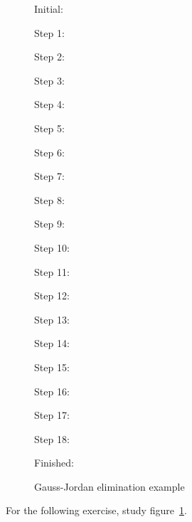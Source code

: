 \begin{figure}[p]
  \tiny
  \begin{multicols}{3}
    Initial:\\ \nobreak
    
    Step 1:\\ \nobreak
    
    Step 2:\\ \nobreak
    
    Step 3:\\ \nobreak
    
    Step 4:\\ \nobreak
    
    Step 5:\\ \nobreak
    
    Step 6:\\ \nobreak
    
    Step 7:\\ \nobreak
    
    Step 8:\\ \nobreak
    
    Step 9:\\ \nobreak
    
    Step 10:\\ \nobreak
    
    Step 11:\\ \nobreak
    
    Step 12:\\ \nobreak
    
    Step 13:\\ \nobreak
    
    Step 14:\\ \nobreak
    
    Step 15:\\ \nobreak
    
    Step 16:\\ \nobreak
    
    Step 17:\\ \nobreak
    
    Step 18:\\ \nobreak
    
    Finished:\\ \nobreak
    
  \end{multicols}
  \caption{Gauss-Jordan elimination example}
  \label{fig:gauss-jordan-ex}
\end{figure}

For the following exercise, study figure~\ref{fig:gauss-jordan-ex}.

